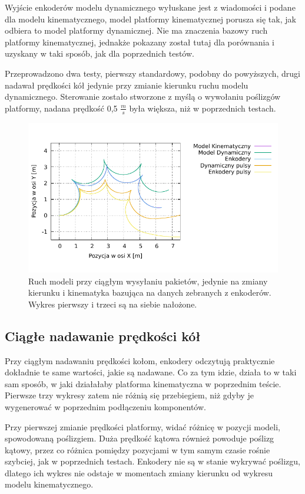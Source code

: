 	Wyjście enkoderów modelu dynamicznego wyłuskane jest z wiadomości i podane dla modelu kinematycznego, model platformy kinematycznej porusza się tak, jak odbiera to model platformy dynamicznej. Nie ma znaczenia bazowy ruch platformy kinematycznej, jednakże pokazany został tutaj dla porównania i uzyskany w taki sposób, jak dla poprzednich testów. 
	
	Przeprowadzono dwa testy, pierwszy standardowy, podobny do powyższych, drugi nadawał prędkości kół jedynie przy zmianie kierunku ruchu modelu dynamicznego.
	Sterowanie zostało stworzone z myślą o wywołaniu poślizgów platformy, nadana prędkość 0,5 $\frac{m}{s}$ była większa, niż w poprzednich testach.
	
	\begin{figure}[H]
		\centering
		\includegraphics[width=\textwidth]{plots/star_encoders.pdf}
			\caption{Ruch modeli przy ciągłym wysyłaniu pakietów, jedynie na zmiany kierunku i kinematyka bazująca na danych zebranych z enkoderów. Wykres pierwszy i trzeci są na siebie nałożone.}
		\label{uml:encoders}
	\end{figure}
	
	\subsection{Ciągłe nadawanie prędkości kół}
		Przy ciągłym nadawaniu prędkości kołom, enkodery odczytują praktycznie dokładnie te same wartości, jakie są nadawane.
		Co za tym idzie, działa to w taki sam sposób, w jaki działałaby platforma kinematyczna w poprzednim teście.
		Pierwsze trzy wykresy zatem nie różnią się przebiegiem, niż gdyby je wygenerować w poprzednim podłączeniu komponentów.
		
		Przy pierwszej zmianie prędkości platformy, widać różnicę w pozycji modeli, spowodowaną poślizgiem.
		Duża prędkość kątowa również powoduje poślizg kątowy, przez co różnica pomiędzy pozycjami w tym samym czasie rośnie szybciej, jak w poprzednich testach.
		Enkodery nie są w stanie wykrywać poślizgu, dlatego ich wykres nie odstaje w momentach zmiany kierunku od wykresu modelu kinematycznego.
		
